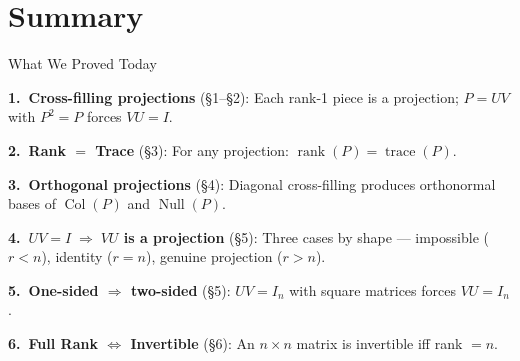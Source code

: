 \documentclass[10pt]{beamer}
\theoremstyle{definition}
\newcommand{\x}[1]{\alert{\textbf{#1}}}
\begin{document}
%
\section{Summary}

\begin{frame}{What We Proved Today}

\x{1.\ Cross-filling projections} (\S1--\S2): Each rank-1 piece is a projection; $P = UV$ with $P^2 = P$ forces $VU = I$.

\vspace{0.2em}

\x{2.\ Rank $=$ Trace} (\S3): For any projection: $\operatorname{rank}(P) = \operatorname{trace}(P)$.

\vspace{0.2em}

\x{3.\ Orthogonal projections} (\S4): Diagonal cross-filling produces orthonormal bases of $\operatorname{Col}(P)$ and $\operatorname{Null}(P)$.

\vspace{0.2em}

\x{4.\ $UV = I \;\Rightarrow\; VU$ is a projection} (\S5): Three cases by shape --- impossible ($r < n$), identity ($r = n$), genuine projection ($r > n$).

\vspace{0.2em}

\x{5.\ One-sided $\Rightarrow$ two-sided} (\S5): $UV = I_n$ with square matrices forces $VU = I_n$.

\vspace{0.2em}

\x{6.\ Full Rank $\iff$ Invertible} (\S6): An $n \times n$ matrix is invertible iff rank $= n$.

\end{frame}
\end{document}

